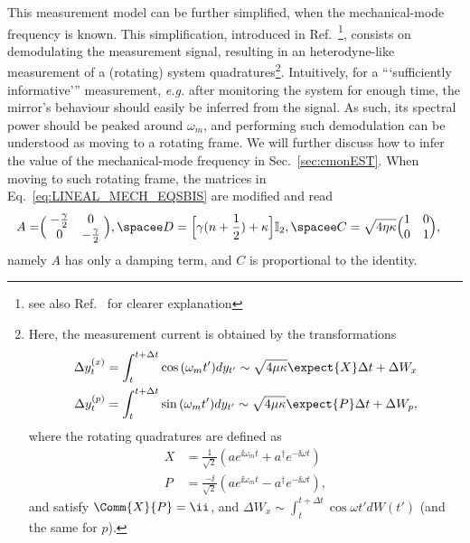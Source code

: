 This measurement model can be further simplified, when the mechanical-mode frequency is known. This simplification, introduced in Ref.~\cite{Szorkovszky2011mechanical}\footnote{see also Ref.~\cite{doherty2012quantum} for clearer explanation}, consists on demodulating the measurement signal, resulting in an heterodyne-like measurement of a (rotating) system quadratures\footnote{Here, the measurement current is obtained by the transformations
\begin{align}
\Delta y_t^{(x)} = \int_t^{t+\Delta t} \cos{(\omega_m t')} dy_{t'} \sim \sqrt{4 \mu \kappa} \expect{X} \Delta t + \Delta W_x \\
\Delta y_t^{(p)} = \int_t^{t+\Delta t} \sin{(\omega_m t')} dy_{t'} \sim \sqrt{4 \mu \kappa} \expect{P} \Delta t + \Delta W_p,
\end{align}
where the rotating quadratures are defined as \begin{align*}X&=\frac{1}{\sqrt{2}}(a e^{\ii \omega_m t} + a^\dagger e^{-\ii \omega t})\\P&=\frac{-\ii}{\sqrt{2}}(a e^{\ii \omega_m t} - a^\dagger e^{-\ii \omega t}),\end{align*} and satisfy $\Comm{X}{P} = \ii$, and $\Delta W_x \sim \int_t^{t+\Delta t}\cos{\omega t'} dW(t')$ (and the same for $p$).
}.
Intuitively, for a ```sufficiently informative''' measurement, \textit{e.g.} after monitoring the system for enough time, the mirror's behaviour should easily be inferred from the signal. As such, its spectral power should be peaked around $\omega_m$, and performing such demodulation can be understood as moving to a rotating frame. We will further discuss how to infer the value of the mechanical-mode frequency in Sec.~\ref{sec:cmonEST}. When moving to such rotating frame, the matrices in Eq.~\ref{eq:LINEAL_MECH_EQSBIS} are modified and read
\begin{align}\label{eq:LINEAL_MECH_EQSBIS}
A =& \Big(\;\begin{matrix}-\frac{\gamma}{2}& 0\\0 & -\frac{\gamma}{2}\end{matrix}\;\Big), \spacee
D = \Big[\gamma (n + \frac{1}{2}) + \kappa \Big]\mathbb{I}_2, \spacee  C = \sqrt{4 \eta \kappa} \Big(\begin{matrix}1&0\\0&1\end{matrix}\Big),
\end{align}
namely $A$ has only a damping term, and $C$ is proportional to the identity.

